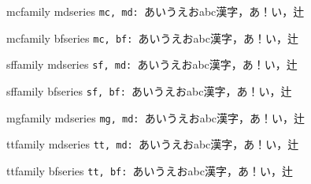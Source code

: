 \documentclass{ltjsarticle}
\begin{document}
\def\r#1#2{ \csname #1family \endcsname \csname #2series \endcsname
  {\tt #1, #2: }あいうえおabc漢字，あ！い，辻
}

\r{mc}{md}

\r{mc}{bf}



\r{sf}{md}

\r{sf}{bf}

\ifdefined\mgfamily
\r{mg}{md}
\fi

\r{tt}{md}

\r{tt}{bf}
\end{document}
